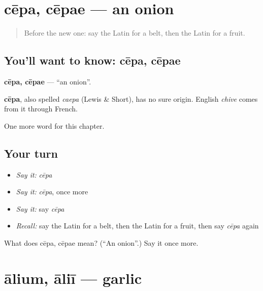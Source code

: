 \section[cēpa, cēpae]{cēpa, cēpae — an onion}

\label{lesson:LA-C126-cepa}



\begin{quote}
Before the new one: say the Latin for a belt, then the Latin for a fruit.
\end{quote}

\subsection*{You'll want to know: cēpa, cēpae}
\textbf{cēpa, cēpae} — \textquotedblleft{}an onion\textquotedblright{}.

\begin{cousinweb}
\textbf{cēpa}, also spelled \emph{caepa} (Lewis \& Short), has no sure origin. English \emph{chive} comes from it through French.
\end{cousinweb}

\begin{grammarlens}[title={What you've built}]
One more word for this chapter.
\end{grammarlens}

\subsection*{Your turn}
\begin{itemize}
\raggedright
  \item \emph{Say it:} \emph{cēpa}
  \item \emph{Say it:} \emph{cēpa}, once more
  \item \emph{Say it:} say \emph{cēpa}
  \item \emph{Recall:} say the Latin for a belt, then the Latin for a fruit, then say \emph{cēpa} again
\end{itemize}

\begin{tcolorbox}[breakable,colback=teal!4,colframe=teal!35!black,title={Before you move on}]
What does cēpa, cēpae mean? (\textquotedblleft{}An onion\textquotedblright{}.) Say it once more.
\end{tcolorbox}
\section[ālium, āliī]{ālium, āliī — garlic}

